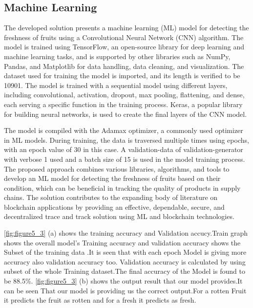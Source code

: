 \subsection{Machine Learning}
\noindent 
The developed solution presents a machine learning (ML) model for detecting the freshness of fruits using a Convolutional Neural Network (CNN) algorithm. The model is trained using TensorFlow, an open-source library for deep learning and machine learning tasks, and is supported by other libraries such as NumPy, Pandas, and Matplotlib for data handling, data cleaning, and visualization. The dataset used for training the model is imported, and its length is verified to be 10901. The model is trained with a sequential model using different layers, including convolutional, activation, dropout, max pooling, flattening, and dense, each serving a specific function in the training process. Keras, a popular library for building neural networks, is used to create the final layers of the CNN model.
\par The model is compiled with the Adamax optimizer, a commonly used optimizer in ML models. During training, the data is traversed multiple times using epochs, with an epoch value of 30 in this case. A validation-data of validation-generator with verbose 1 used and a batch size of 15 is used in the model training process. The proposed approach combines various libraries, algorithms, and tools to develop an ML model for detecting the freshness of fruits based on their condition, which can be beneficial in tracking the quality of products in supply chains. The solution contributes to the expanding body of literature on blockchain applications by providing an effective, dependable, secure, and decentralized trace and track solution using ML and blockchain technologies.

\noindent \ref{fig:figure5_3} (a) shows the training accuracy and Validation accucy.Train graph shows the overall model’s Training accuracy and validation accuracy shows the Subset of the training data .It is seen that with each epoch Model is giving more accuracy also validation accuracy too. Validation accuracy is calculated by using subset of the whole 
Training dataset.The final accuracy of the Model is found to be 88.5\%.
\ref{fig:figure5_3} (b) shows the output result that our model  provides.It can be seen That our model is providing us the correct
output.For a rotten Fruit it predicts the fruit as rotten and for a fresh it predicts as fresh.



